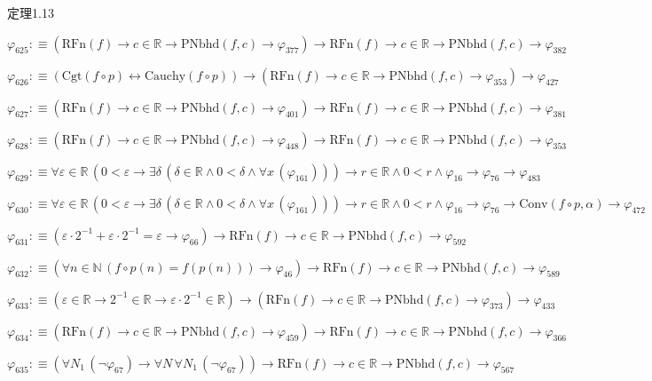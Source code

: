 \begin{fullproof}{定理1.13}
\begin{abbrevlist}
\item $\varphi_{625} :\equiv (\mathrm{RFn}(f) \to c \in \mathbb{R} \to \mathrm{PNbhd}(f,c) \to \varphi_{377}) \to \mathrm{RFn}(f) \to c \in \mathbb{R} \to \mathrm{PNbhd}(f,c) \to \varphi_{382}$
\item $\varphi_{626} :\equiv (\mathrm{Cgt}(f \circ p) \leftrightarrow \mathrm{Cauchy}(f \circ p)) \to (\mathrm{RFn}(f) \to c \in \mathbb{R} \to \mathrm{PNbhd}(f,c) \to \varphi_{353}) \to \varphi_{427}$
\item $\varphi_{627} :\equiv (\mathrm{RFn}(f) \to c \in \mathbb{R} \to \mathrm{PNbhd}(f,c) \to \varphi_{401}) \to \mathrm{RFn}(f) \to c \in \mathbb{R} \to \mathrm{PNbhd}(f,c) \to \varphi_{381}$
\item $\varphi_{628} :\equiv (\mathrm{RFn}(f) \to c \in \mathbb{R} \to \mathrm{PNbhd}(f,c) \to \varphi_{448}) \to \mathrm{RFn}(f) \to c \in \mathbb{R} \to \mathrm{PNbhd}(f,c) \to \varphi_{353}$
\item $\varphi_{629} :\equiv \forall \varepsilon \in \mathbb{R}\,(0 < \varepsilon \to \exists \delta\,(\delta \in \mathbb{R} \land 0 < \delta \land \forall x\,(\varphi_{161}))) \to r \in \mathbb{R} \land 0 < r \land \varphi_{16} \to \varphi_{76} \to \varphi_{483}$
\item $\varphi_{630} :\equiv \forall \varepsilon \in \mathbb{R}\,(0 < \varepsilon \to \exists \delta\,(\delta \in \mathbb{R} \land 0 < \delta \land \forall x\,(\varphi_{161}))) \to r \in \mathbb{R} \land 0 < r \land \varphi_{16} \to \varphi_{76} \to \mathrm{Conv}(f \circ p,\alpha) \to \varphi_{472}$
\item $\varphi_{631} :\equiv (\varepsilon \cdot 2^{-1} + \varepsilon \cdot 2^{-1} = \varepsilon \to \varphi_{66}) \to \mathrm{RFn}(f) \to c \in \mathbb{R} \to \mathrm{PNbhd}(f,c) \to \varphi_{592}$
\item $\varphi_{632} :\equiv (\forall n \in \mathbb{N}\,(f \circ p(n) = f(p(n))) \to \varphi_{46}) \to \mathrm{RFn}(f) \to c \in \mathbb{R} \to \mathrm{PNbhd}(f,c) \to \varphi_{589}$
\item $\varphi_{633} :\equiv (\varepsilon \in \mathbb{R} \to 2^{-1} \in \mathbb{R} \to \varepsilon \cdot 2^{-1} \in \mathbb{R}) \to (\mathrm{RFn}(f) \to c \in \mathbb{R} \to \mathrm{PNbhd}(f,c) \to \varphi_{373}) \to \varphi_{433}$
\item $\varphi_{634} :\equiv (\mathrm{RFn}(f) \to c \in \mathbb{R} \to \mathrm{PNbhd}(f,c) \to \varphi_{459}) \to \mathrm{RFn}(f) \to c \in \mathbb{R} \to \mathrm{PNbhd}(f,c) \to \varphi_{366}$
\item $\varphi_{635} :\equiv (\forall N_{1}\,(\neg \varphi_{67}) \to \forall N\,\forall N_{1}\,(\neg \varphi_{67})) \to \mathrm{RFn}(f) \to c \in \mathbb{R} \to \mathrm{PNbhd}(f,c) \to \varphi_{567}$

\end{abbrevlist}
\end{fullproof}
